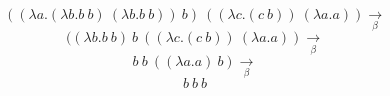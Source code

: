 \documentclass[12pt]{article}
\begin{document}
	$$((\lambda a.(\lambda b.b\ b)\ (\lambda b.b\ b))\ b)\ ((\lambda c.(c\ b))\ (\lambda a.a))\underset{\beta}{\to}$$
	$$ ((\lambda b.b\ b)\ b\ ((\lambda c.(c\ b))\ (\lambda a.a)) \underset{\beta}{\to}$$
	$$ b\ b\ ((\lambda a.a)\ b) \underset{\beta}{\to}$$
	$$ b\ b\ b$$
\end{document}

